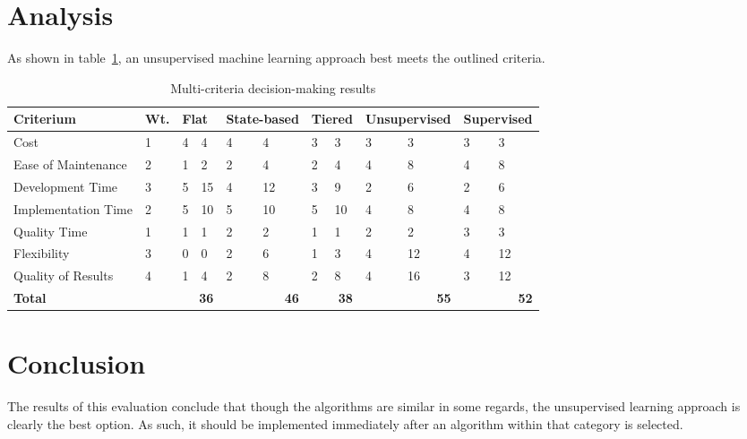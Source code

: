 \documentclass[12pt]{article}
\begin{document}
\section{Analysis}
As shown in table~\ref{tbl:mcdm}, an unsupervised machine learning approach best meets the outlined criteria.

\begin{table}[ht]
\caption{Multi-criteria decision-making results}
\label{tbl:mcdm}
\centering
\begin{tabular}{|p{4.0cm}|p{0.65cm}|p{0.4cm}|p{0.4cm}|p{0.95cm}|p{0.95cm}|p{0.5cm}|p{0.5cm}|p{0.95cm}|p{0.95cm}|p{0.75cm}|p{0.75cm}|}
	\hline
	{\bf Criterium} & {\bf Wt.} & \multicolumn{2}{|p{0.8cm}|}{{\bf Flat}} & \multicolumn{2}{|p{1.9cm}|}{{\bf \mbox{State-based}}} & \multicolumn{2}{|p{1.0cm}|}{{\bf Tiered}} & \multicolumn{2}{|p{1.9cm}|}{{\bf Unsupervised}} & \multicolumn{2}{|p{1.5cm}|}{{\bf Supervised}} \\
	\hline
	\hline
	Cost                & 1 & 4 &  4 & 4 &  4 & 3 &  3 & 3 &  3 & 3 &  3 \\
	Ease of Maintenance & 2 & 1 &  2 & 2 &  4 & 2 &  4 & 4 &  8 & 4 &  8 \\
	Development Time    & 3 & 5 & 15 & 4 & 12 & 3 &  9 & 2 &  6 & 2 &  6 \\
	Implementation Time & 2 & 5 & 10 & 5 & 10 & 5 & 10 & 4 &  8 & 4 &  8 \\
	Quality Time        & 1 & 1 &  1 & 2 &  2 & 1 &  1 & 2 &  2 & 3 &  3 \\
	Flexibility         & 3 & 0 &  0 & 2 &  6 & 1 &  3 & 4 & 12 & 4 & 12 \\
	Quality of Results  & 4 & 1 &  4 & 2 &  8 & 2 &  8 & 4 & 16 & 3 & 12 \\
	\hline
	\hline
	{\bf Total}         &   & \multicolumn{2}{|r|}{{\bf 36}} & \multicolumn{2}{|r|}{{\bf 46}} & \multicolumn{2}{|r|}{{\bf 38}} & \multicolumn{2}{|r|}{{\bf 55}} & \multicolumn{2}{|r|}{{\bf 52}} \\
	\hline
\end{tabular}
\end{table}
\newpage


\section{Conclusion}
The results of this evaluation conclude that though the algorithms are similar in some regards, the unsupervised learning approach is clearly the best option. As such, it should be implemented immediately after an algorithm within that category is selected.
\end{document}
